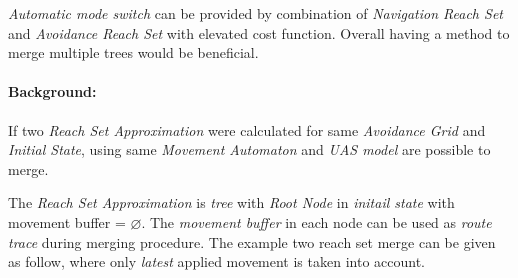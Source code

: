 \emph{Automatic mode switch} can be provided by combination of \emph{Navigation Reach Set} and \emph{Avoidance Reach Set} with elevated cost function. Overall having a method to merge multiple trees would be beneficial.

\paragraph{Background:} If two \emph{Reach Set Approximation} were calculated for same \emph{Avoidance Grid} and \emph{Initial State}, using same \emph{Movement Automaton} and \emph{UAS model} are possible to merge. 

The \emph{Reach Set Approximation} is \emph{tree} with \emph{Root Node} in \emph{initail state} with movement buffer = $\varnothing$. The \emph{movement buffer} in each node can be used as \emph{route trace} during merging procedure. The example two reach set merge can be given as follow, where only \emph{latest} applied movement is taken into account.

